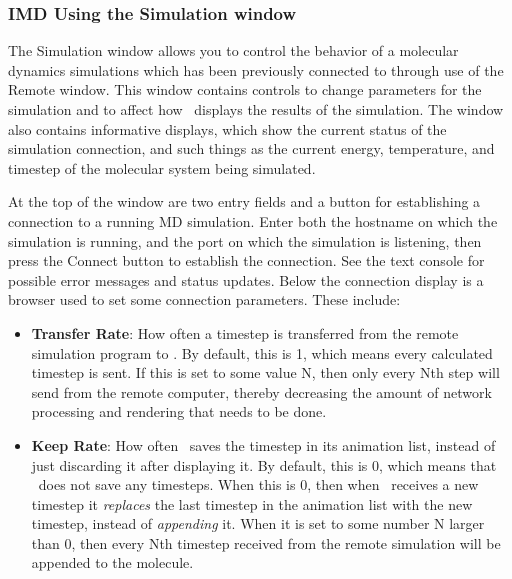 \subsubsection{IMD Using the Simulation window}
The {\sf Simulation} window allows you to control the behavior of a 
molecular dynamics
simulations which has been previously connected to through use of the
Remote window.  This window contains controls to change parameters for the
simulation and to affect how \VMD\ displays the results of the simulation.
The window also contains informative displays, which show the current status
of the simulation connection, and such things as the current energy,
temperature, and timestep of the molecular system being simulated.

At the top of the window are two entry fields and a button for establishing
a connection to a running MD simulation.  Enter both the hostname on which 
the simulation is running, and the port on which the simulation is listening,
then press the Connect button to establish the connection.  See the text 
console for possible error messages and status updates.
Below the connection display is a browser used to set some connection 
parameters.  These include:
\begin{itemize}
  \item {\bf Transfer Rate}: How often a timestep is transferred from the
remote simulation program to \VMD.  By default, this is 1, which means
every calculated timestep is sent.  If this is set to some value N,
then only every Nth step will send from the remote computer, 
thereby decreasing the amount of network processing and rendering 
that needs to be done.

  \item {\bf Keep Rate}: How often \VMD\ saves the timestep in its
animation list, instead of just discarding it after displaying it.  By
default, this is 0, which means that \VMD\ does not save any timesteps.
When this is 0, then when \VMD\ receives a new timestep it {\em replaces} the
last timestep in the animation list with the new timestep, instead of
{\em appending} it.  When it is set to some number N larger than 0, then
every Nth timestep received from the remote simulation will be appended to
the molecule. 
\end{itemize}

